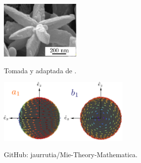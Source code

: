 \documentclass[a0paper,portrait]{baposter}
\begin{document}
\begin{poster}
{			
			\begin{minipage}[c]{.35\linewidth}
				\centering
				{\includegraphics[width=4cm]{flower.pdf}}
				\begin{singlespace}
					\tiny Tomada y adaptada de \cite{Mendez}.
				\end{singlespace}
					
			\end{minipage}
			\begin{minipage}[c]{.65\linewidth}
				\centering
				\includegraphics[width=6.5cm]{dipoleelectric.pdf}
				\begin{singlespace}
					\tiny GitHub: jaurrutia/Mie-Theory-Mathematica.
				\end{singlespace}
			\end{minipage}	
		
			
		}
		

\end{poster}
\end{document}
